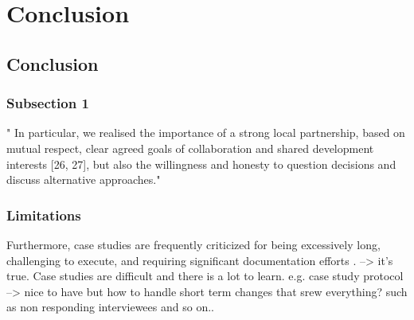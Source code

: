 
\chapter{Conclusion} %

\label{ChapterX} %


\section{Conclusion}

\subsection{Subsection 1}



" In particular, we realised the importance of a strong local partnership, based on mutual respect, clear agreed goals of collaboration and shared development interests [26, 27], but also the willingness and honesty to question decisions and discuss alternative approaches."



\subsection{Limitations}

Furthermore, case studies are frequently criticized for being excessively long, challenging to execute, and requiring significant documentation efforts \autocite{yinCaseStudyResearch1984}.
-->
it's true. Case studies are difficult and there is a lot to learn.
e.g. case study protocol --> nice to have but how to handle short term changes that srew everything? such as non responding interviewees and so on.. 


